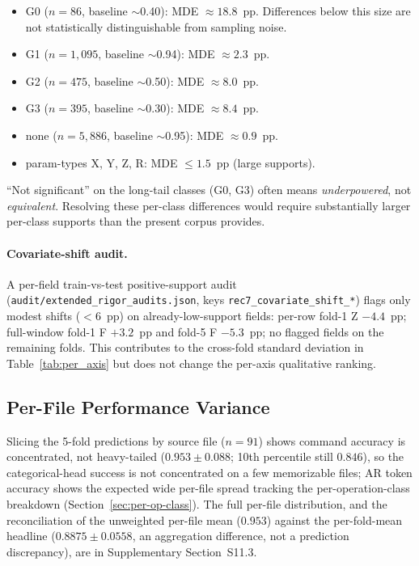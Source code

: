 \documentclass[sensors,article,submit,moreauthors,pdftex]{Definitions/mdpi}
\begin{document}
\begin{itemize}
\item G0 ($n\!=\!86$, baseline $\sim$0.40): MDE $\approx 18.8$~pp. Differences below this size are not statistically distinguishable from sampling noise.
\item G1 ($n\!=\!1{,}095$, baseline $\sim$0.94): MDE $\approx 2.3$~pp.
\item G2 ($n\!=\!475$, baseline $\sim$0.50): MDE $\approx 8.0$~pp.
\item G3 ($n\!=\!395$, baseline $\sim$0.30): MDE $\approx 8.4$~pp.
\item none ($n\!=\!5{,}886$, baseline $\sim$0.95): MDE $\approx 0.9$~pp.
\item param-types X, Y, Z, R: MDE $\le 1.5$~pp (large supports).
\end{itemize}

\noindent ``Not significant'' on the long-tail classes (G0, G3) often means \emph{underpowered}, not \emph{equivalent}. Resolving these per-class differences would require substantially larger per-class supports than the present corpus provides.

\paragraph{Covariate-shift audit.}\label{sec:lim-covariate} A per-field train-vs-test positive-support audit (\texttt{audit/extended\_rigor\_audits.json}, keys \texttt{rec7\_covariate\_shift\_*}) flags only modest shifts ($<\!6$~pp) on already-low-support fields: per-row fold-1 Z $-4.4$~pp; full-window fold-1 F $+3.2$~pp and fold-5 F $-5.3$~pp; no flagged fields on the remaining folds. This contributes to the cross-fold standard deviation in Table~\ref{tab:per_axis} but does not change the per-axis qualitative ranking.

\subsection{Per-File Performance Variance}
\label{sec:lim-per-file}

Slicing the 5-fold predictions by source file ($n=91$) shows command accuracy is concentrated, not heavy-tailed ($0.953 \pm 0.088$; 10th percentile still $0.846$), so the categorical-head success is not concentrated on a few memorizable files; AR token accuracy shows the expected wide per-file spread tracking the per-operation-class breakdown (Section~\ref{sec:per-op-class}). The full per-file distribution, and the reconciliation of the unweighted per-file mean ($0.953$) against the per-fold-mean headline ($0.8875 \pm 0.0558$, an aggregation difference, not a prediction discrepancy), are in Supplementary Section~S11.3.
\end{document}
